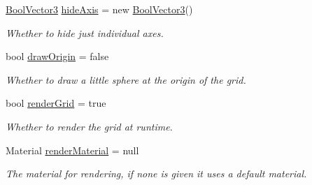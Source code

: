 \begin{DoxyCompactItemize}
\hyperlink{class_grid_framework_1_1_vectors_1_1_bool_vector3}{Bool\+Vector3} \hyperlink{class_g_f_grid_ac902d0ffe9b552908a929fda497a39b5_ac902d0ffe9b552908a929fda497a39b5}{hide\+Axis} = new \hyperlink{class_grid_framework_1_1_vectors_1_1_bool_vector3}{Bool\+Vector3}()
\begin{DoxyCompactList}\small\item\em Whether to hide just individual axes.\end{DoxyCompactList}\item 
bool \hyperlink{class_g_f_grid_a030e49e310751d9b1c7d08b57ca93358_a030e49e310751d9b1c7d08b57ca93358}{draw\+Origin} = false
\begin{DoxyCompactList}\small\item\em Whether to draw a little sphere at the origin of the grid.\end{DoxyCompactList}\item 
bool \hyperlink{class_g_f_grid_a8b33c2e0823730157804456f4ffb51ed_a8b33c2e0823730157804456f4ffb51ed}{render\+Grid} = true
\begin{DoxyCompactList}\small\item\em Whether to render the grid at runtime.\end{DoxyCompactList}\item 
Material \hyperlink{class_g_f_grid_a5a840197e72fa8b32fb905cc2a9a4d4a_a5a840197e72fa8b32fb905cc2a9a4d4a}{render\+Material} = null
\begin{DoxyCompactList}\small\item\em The material for rendering, if none is given it uses a default material.\end{DoxyCompactList}\end{DoxyCompactItemize}

